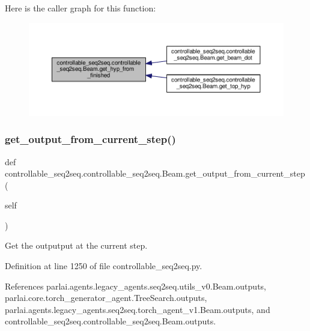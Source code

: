 Here is the caller graph for this function\+:
\nopagebreak
\begin{figure}[H]
\begin{center}
\leavevmode
\includegraphics[width=350pt]{classcontrollable__seq2seq_1_1controllable__seq2seq_1_1Beam_ab4532f62a0428f5581680c9915b9c95e_icgraph}
\end{center}
\end{figure}
\mbox{\label{classcontrollable__seq2seq_1_1controllable__seq2seq_1_1Beam_a45cfd3d054f6ec009e6916f01f8c3528}} 
\subsubsection{\texorpdfstring{get\+\_\+output\+\_\+from\+\_\+current\+\_\+step()}{get\_output\_from\_current\_step()}}
{\footnotesize\ttfamily def controllable\+\_\+seq2seq.\+controllable\+\_\+seq2seq.\+Beam.\+get\+\_\+output\+\_\+from\+\_\+current\+\_\+step (\begin{DoxyParamCaption}\item[{}]{self }\end{DoxyParamCaption})}

\begin{DoxyVerb}Get the outputput at the current step.\end{DoxyVerb}
 

Definition at line 1250 of file controllable\+\_\+seq2seq.\+py.



References parlai.\+agents.\+legacy\+\_\+agents.\+seq2seq.\+utils\+\_\+v0.\+Beam.\+outputs, parlai.\+core.\+torch\+\_\+generator\+\_\+agent.\+Tree\+Search.\+outputs, parlai.\+agents.\+legacy\+\_\+agents.\+seq2seq.\+torch\+\_\+agent\+\_\+v1.\+Beam.\+outputs, and controllable\+\_\+seq2seq.\+controllable\+\_\+seq2seq.\+Beam.\+outputs.

